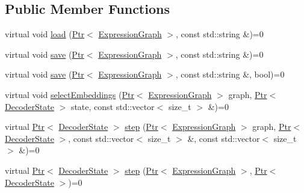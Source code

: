 \subsection*{Public Member Functions}
\begin{DoxyCompactItemize}
\item 
virtual void \hyperlink{classmarian_1_1EncoderDecoderBase_aed4f5b4c03698b66ab47827866e67947}{load} (\hyperlink{namespacemarian_ad1a373be43a00ef9ce35666145137b08}{Ptr}$<$ \hyperlink{classmarian_1_1ExpressionGraph}{Expression\+Graph} $>$, const std\+::string \&)=0
\item 
virtual void \hyperlink{classmarian_1_1EncoderDecoderBase_a38bf117cbdc25c25357dd1922cfd2a2d}{save} (\hyperlink{namespacemarian_ad1a373be43a00ef9ce35666145137b08}{Ptr}$<$ \hyperlink{classmarian_1_1ExpressionGraph}{Expression\+Graph} $>$, const std\+::string \&)=0
\item 
virtual void \hyperlink{classmarian_1_1EncoderDecoderBase_a2bad3e7fc27ea8b139f5a11a1fabe508}{save} (\hyperlink{namespacemarian_ad1a373be43a00ef9ce35666145137b08}{Ptr}$<$ \hyperlink{classmarian_1_1ExpressionGraph}{Expression\+Graph} $>$, const std\+::string \&, bool)=0
\item 
virtual void \hyperlink{classmarian_1_1EncoderDecoderBase_a7613ff13f2fe0f11571d21e2235f7514}{select\+Embeddings} (\hyperlink{namespacemarian_ad1a373be43a00ef9ce35666145137b08}{Ptr}$<$ \hyperlink{classmarian_1_1ExpressionGraph}{Expression\+Graph} $>$ graph, \hyperlink{namespacemarian_ad1a373be43a00ef9ce35666145137b08}{Ptr}$<$ \hyperlink{classmarian_1_1DecoderState}{Decoder\+State} $>$ state, const std\+::vector$<$ size\+\_\+t $>$ \&)=0
\item 
virtual \hyperlink{namespacemarian_ad1a373be43a00ef9ce35666145137b08}{Ptr}$<$ \hyperlink{classmarian_1_1DecoderState}{Decoder\+State} $>$ \hyperlink{classmarian_1_1EncoderDecoderBase_a87b83c44031999f47ee3bad03ababc9a}{step} (\hyperlink{namespacemarian_ad1a373be43a00ef9ce35666145137b08}{Ptr}$<$ \hyperlink{classmarian_1_1ExpressionGraph}{Expression\+Graph} $>$ graph, \hyperlink{namespacemarian_ad1a373be43a00ef9ce35666145137b08}{Ptr}$<$ \hyperlink{classmarian_1_1DecoderState}{Decoder\+State} $>$, const std\+::vector$<$ size\+\_\+t $>$ \&, const std\+::vector$<$ size\+\_\+t $>$ \&)=0
\item 
virtual \hyperlink{namespacemarian_ad1a373be43a00ef9ce35666145137b08}{Ptr}$<$ \hyperlink{classmarian_1_1DecoderState}{Decoder\+State} $>$ \hyperlink{classmarian_1_1EncoderDecoderBase_a6007e315951e619751aff381020174ea}{step} (\hyperlink{namespacemarian_ad1a373be43a00ef9ce35666145137b08}{Ptr}$<$ \hyperlink{classmarian_1_1ExpressionGraph}{Expression\+Graph} $>$, \hyperlink{namespacemarian_ad1a373be43a00ef9ce35666145137b08}{Ptr}$<$ \hyperlink{classmarian_1_1DecoderState}{Decoder\+State} $>$)=0

\end{DoxyCompactItemize}
